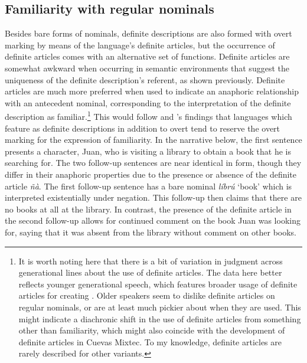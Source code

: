 \documentclass[output=paper,modfonts,nonflat]{langsci/langscibook}
\begin{document}
\subsection{Familiarity with regular nominals} \label{sec:cisneros:4.2}

Besides bare forms of nominals, definite descriptions are also formed with overt marking by means of the language's definite articles, but the occurrence of definite articles comes with an alternative set of functions.  Definite articles are somewhat awkward when occurring in semantic environments that suggest the uniqueness of the definite description's referent, as shown previously.  Definite articles are much more preferred when used to indicate an anaphoric relationship with an antecedent nominal, corresponding to the interpretation of the definite description as familiar.\footnote{It is worth noting here that there is a bit of variation in judgment across generational lines about the use of definite articles.  The data here better reflects younger generational speech, which features broader usage of definite articles for creating .  Older speakers seem to dislike definite articles on regular nominals, or are at least much pickier about when they are used.  This might indicate a diachronic shift in the use of definite articles from something other than familiarity, which might also coincide with the development of definite articles in Cuevas Mixtec.  To my knowledge, definite articles are rarely described for other  variants.}  This would follow \citeauthor{Schwarz2009} and \citeauthor{Jenks2015}'s findings that languages which feature  as definite descriptions in addition to overt  tend to reserve the overt marking for the expression of familiarity.  In the narrative below, the first sentence presents a character, Juan, who is visiting a library to obtain a book that he is searching for.  The two follow-up sentences are near identical in form, though they differ in their anaphoric properties due to the presence or absence of the definite article \emph{\~n\`a}.  The first follow-up sentence has a bare nominal \textit{l\'ibr\'u} `book' which is interpreted existentially under negation.  This follow-up then claims that there are no books at all at the library.  In contrast, the presence of the definite article in the second follow-up allows for continued comment on the book Juan was looking for, saying that it was absent from the library without comment on other books. 
\end{document}
